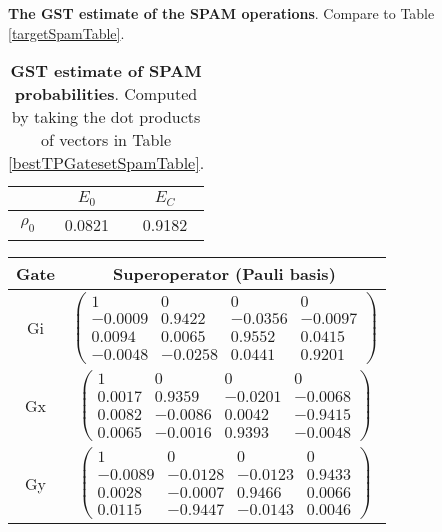 {\begin{table}[h]
\begin{center}
\caption{\textbf{The GST estimate of the SPAM operations}.  Compare to Table \ref{targetSpamTable}.\label{bestTPGatesetSpamTable}}
\end{center}
\end{table}

\begin{table}[h]
\begin{center}
\begin{tabular}[l]{|c|c|c|}
\hline
 & $E_{0}$ & $E_C$ \\ \hline
$\rho_{0}$ & 0.0821 & 0.9182 \\ \hline
\end{tabular}

\caption{\textbf{GST estimate of SPAM probabilities}.  Computed by taking the dot products of vectors in Table \ref{bestTPGatesetSpamTable}.\label{bestTPGatesetSpamParametersTable}}
\end{center}
\end{table}

\begin{table}[h]
\begin{center}
\begin{tabular}[l]{|c|c|}
\hline
Gate & Superoperator (Pauli basis) \\ \hline
Gi & $ \left(\!\!\begin{array}{cccc}
1 & 0 & 0 & 0 \\ 
-0.0009 & 0.9422 & -0.0356 & -0.0097 \\ 
0.0094 & 0.0065 & 0.9552 & 0.0415 \\ 
-0.0048 & -0.0258 & 0.0441 & 0.9201
 \end{array}\!\!\right) $
 \\ \hline
Gx & $ \left(\!\!\begin{array}{cccc}
1 & 0 & 0 & 0 \\ 
0.0017 & 0.9359 & -0.0201 & -0.0068 \\ 
0.0082 & -0.0086 & 0.0042 & -0.9415 \\ 
0.0065 & -0.0016 & 0.9393 & -0.0048
 \end{array}\!\!\right) $
 \\ \hline
Gy & $ \left(\!\!\begin{array}{cccc}
1 & 0 & 0 & 0 \\ 
-0.0089 & -0.0128 & -0.0123 & 0.9433 \\ 
0.0028 & -0.0007 & 0.9466 & 0.0066 \\ 
0.0115 & -0.9447 & -0.0143 & 0.0046
 \end{array}\!\!\right) $
 \\ \hline
\end{tabular}


\end{center}
\end{table}}
